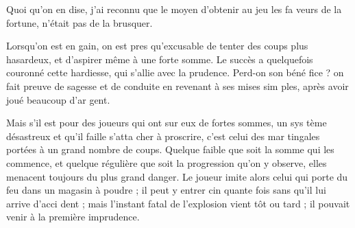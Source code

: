 Quoi qu'on en dise, j'ai reconnu
que le moyen d'obtenir au jeu les fa%
veurs de la fortune, n'était pas de la
brusquer.

Lorsqu'on est en gain, on est pres%
qu'excusable de tenter des coups plus
hasardeux, et d'aspirer même à une
forte somme. Le succès a quelquefois
couronné cette hardiesse, qui s'allie
avec la prudence. Perd-on son béné%
fice ? on fait preuve de sagesse et de
conduite en revenant à ses mises sim%
ples, après avoir joué beaucoup d'ar%
gent.

Mais s'il est pour des joueurs qui
ont sur eux de fortes sommes, un sys%
tème désastreux et qu'il faille s'atta%
cher à proscrire, c'est celui des mar%
tingales portées à un grand nombre
de coups. Quelque faible que soit la
somme qui les commence, et quelque
régulière que soit la progression qu'on
y observe, elles menacent toujours du
plus grand danger. Le joueur imite
alors celui qui porte du feu dans un
magasin à poudre ; il peut y entrer cin%
quante fois sans qu'il lui arrive d'acci%
dent ; mais l'instant fatal de l'explosion
vient tôt ou tard ; il pouvait venir à la
première imprudence.

